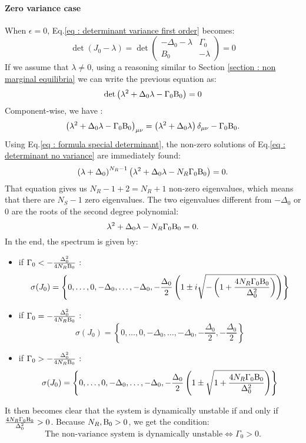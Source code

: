 \documentclass[12pt, titlepage]{report}
\begin{document}
	\paragraph{Zero variance case}
	When $\epsilon=0$, Eq.\eqref{eq : determinant variance first order} becomes:
	\begin{equation}
	\det(J_0-\lambda)=\det\begin{pmatrix}
	-\Delta_0-\lambda & \Gamma_0 \\
	B_0 & -\lambda
	\end{pmatrix}
	=
	0
	\end{equation}
	If we assume that $\lambda\neq 0$, using a reasoning similar to Section \ref{section : non marginal equilibria} we can write the previous equation as:
	\begin{equation}
	\det\left(\lambda^2+\Delta_0 \lambda - \Gamma_0 \text{B}_0 \right)=0 \label{eq : determinant no variance}
	\end{equation}
	Component-wise, we have :
	\begin{equation}
	\left(\lambda^2+\Delta_0 \lambda - \Gamma_0 \text{B}_0 \right)_{\mu\nu} = \left(\lambda^2+\Delta_0 \lambda\right)\delta_{\mu \nu} - \Gamma_0\text{B}_0.
	\end{equation}
	Using Eq.\eqref{eq : formula special determinant}, the non-zero solutions of Eq.\eqref{eq : determinant no variance} are immediately found:
	\begin{equation}
	\left(\lambda+\Delta_0\right)^{N_R-1}\left(\lambda^2+\Delta_0 \lambda -N_R \Gamma_0 \text{B}_0\right)=0.
	\end{equation}
	That equation gives us $N_R-1+2=N_R+1$ non-zero eigenvalues, which means that there are $N_S-1$ zero eigenvalues. The two eigenvalues different from $-\Delta_0$ or $0$ are the roots of the second degree polynomial:
	\begin{equation}
	\lambda^2 + \Delta_0 \lambda- N_R \Gamma_0 \text{B}_0 =0.
	\end{equation}
	In the end, the spectrum is given by:
	\begin{itemize}
	\item if $\Gamma_0 < -\frac{\Delta_0^2}{4 N_R \text{B}_0}$ :
	\begin{equation}
	\sigma(J_0)= \left\{0, \dots, 0, -\Delta_0, \dots, -\Delta_0, -\frac{\Delta_0}{2} \left(1\pm i \sqrt{-\left(1+\frac{4N_R\Gamma_0\text{B}_0}{\Delta_0^2}\right)}\right)\right\}
	\end{equation}
	\item if $\Gamma_0 = -\frac{\Delta_0^2}{4 N_R \text{B}_0}$ :
	\begin{equation}
	\sigma(J_0)= \left\{0, \dots, 0, -\Delta_0, \dots, -\Delta_0, -\frac{\Delta_0}{2}, -\frac{\Delta_0}{2}\right\}
	\end{equation}
	\item if $\Gamma_0 > -\frac{\Delta_0^2}{4 N_R \text{B}_0}$ :
	\begin{equation}
	\sigma(J_0)= \left\{0, \dots, 0, -\Delta_0, \dots, -\Delta_0, -\frac{\Delta_0}{2} \left(1\pm \sqrt{1+\frac{4N_R\Gamma_0\text{B}_0}{\Delta_0^2}}\right)\right\}
	\end{equation}
	\end{itemize}
	It then becomes clear that the system is dynamically unstable if and only if $\frac{4N_R\Gamma_0 \text{B}_0}{\Delta_0^2} > 0 $. Because $N_R, \text{B}_0 > 0$, we get the condition:
	\begin{equation}
	\boxed{
	\text{The non-variance system is dynamically unstable} \iff \Gamma_0 > 0.
	}
	\end{equation}
\end{document}

